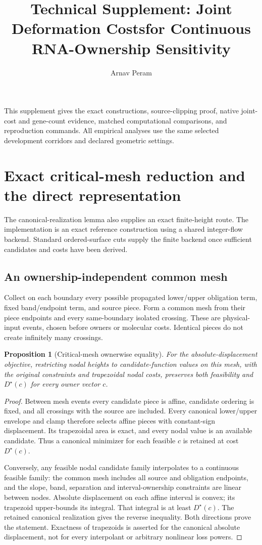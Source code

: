\documentclass[10pt,letterpaper]{article}
\title{Technical Supplement: Joint Deformation Costs\newline for Continuous RNA-Ownership Sensitivity}
\author{Arnav Peram}\date{}
\newtheorem{proposition}[theorem]{Proposition}
\begin{document}
\maketitle
\noindent This supplement gives the exact constructions, source-clipping proof, native joint-cost and gene-count evidence, matched computational comparisons, and reproduction commands. All empirical analyses use the same selected development corridors and declared geometric settings.

\section{Exact critical-mesh reduction and the direct representation}
The canonical-realization lemma also supplies an exact finite-height route. The implementation is an exact reference construction using a shared integer-flow backend. Standard ordered-surface cuts supply the finite backend once sufficient candidates and costs have been derived.

\subsection{An ownership-independent common mesh}
Collect on each boundary every possible propagated lower/upper obligation term, fixed band/endpoint term, and source piece. Form a common mesh from their piece endpoints and every same-boundary isolated crossing. These are physical-input events, chosen before owners or molecular costs. Identical pieces do not create infinitely many crossings.

\begin{proposition}[Critical-mesh ownerwise equality]
For the absolute-displacement objective, restricting nodal heights to candidate-function values on this mesh, with the original constraints and trapezoidal nodal costs, preserves both feasibility and $D^\star(c)$ for every owner vector $c$.
\end{proposition}
\begin{proof}
Between mesh events every candidate piece is affine, candidate ordering is fixed, and all crossings with the source are included. Every canonical lower/upper envelope and clamp therefore selects affine pieces with constant-sign displacement. Its trapezoidal area is exact, and every nodal value is an available candidate. Thus a canonical minimizer for each feasible $c$ is retained at cost $D^\star(c)$.

Conversely, any feasible nodal candidate family interpolates to a continuous feasible family: the common mesh includes all source and obligation endpoints, and the slope, band, separation and interval-ownership constraints are linear between nodes. Absolute displacement on each affine interval is convex; its trapezoid upper-bounds its integral. That integral is at least $D^\star(c)$. The retained canonical realization gives the reverse inequality. Both directions prove the statement. Exactness of trapezoids is asserted for the canonical absolute displacement, not for every interpolant or arbitrary nonlinear loss powers.
\end{proof}
\end{document}
